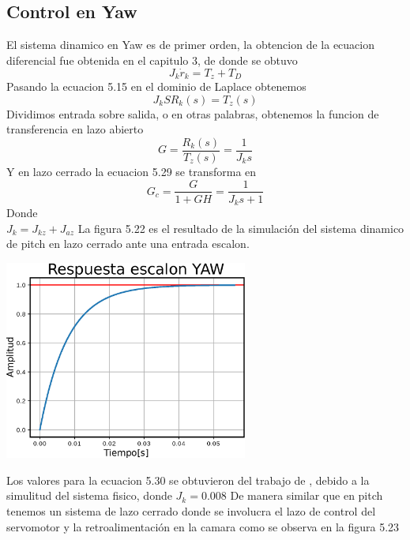 \subsection{Control en Yaw}
El sistema dinamico en Yaw es de primer orden, la obtencion de la ecuacion diferencial 
fue obtenida en el capitulo 3, de donde se obtuvo
\begin{equation}
	J_k\dot{r}_k = T_z+T_D
\end{equation}
Pasando la ecuacion 5.15 en el dominio de Laplace obtenemos
\begin{equation}
	J_{k}SR_k(s) = T_z(s)
\end{equation}
Dividimos entrada sobre salida, o en otras palabras, obtenemos la funcion de transferencia en lazo abierto
\begin{equation}
	G = \frac{R_k(s)}{T_z(s)} =  \frac{1}{J_{k}s}
\end{equation}
Y en lazo cerrado la ecuacion 5.29 se transforma en 
\begin{equation}
	G_c = \frac{G}{1 +GH} = \frac{1}{J_{k}s+1}
\end{equation}
Donde \\
$J_k = J_{kz} + J_{az} $ 
La figura 5.22 es el resultado de la simulación del sistema dinamico de pitch en lazo cerrado ante una entrada escalon.
\begin{center}
	\includegraphics[width=0.6\textwidth]{Contenido/Cuerpo/Capitulo5/Fig39.eps}
	\label{Fig4}
\end{center}
Los valores para la ecuacion 5.30 se obtuvieron del trabajo de \cite{Paper::Abdo2013}, debido a la simulitud del sistema fisico, donde 
$J_{k} = 0.008$ 
De manera similar que en pitch tenemos un sistema de lazo cerrado donde se involucra el lazo de control del 
servomotor y la retroalimentación en la camara como se observa en la figura 5.23
